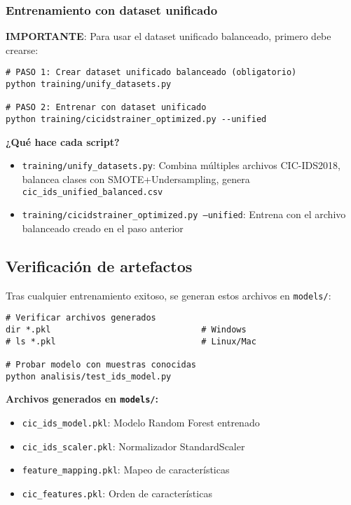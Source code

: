\subsubsection*{Entrenamiento con dataset unificado}
\textbf{IMPORTANTE}: Para usar el dataset unificado balanceado, primero debe crearse:

\begin{lstlisting}[style=tfgbash,caption={Crear y entrenar con dataset unificado},label=List.UnifiedTrain]
# PASO 1: Crear dataset unificado balanceado (obligatorio)
python training/unify_datasets.py

# PASO 2: Entrenar con dataset unificado
python training/cicidstrainer_optimized.py --unified
\end{lstlisting}

\textbf{¿Qué hace cada script?}
\begin{itemize}
  \item \texttt{training/unify\_datasets.py}: Combina múltiples archivos CIC-IDS2018, balancea clases con SMOTE+Undersampling, genera \texttt{cic\_ids\_unified\_balanced.csv}
  \item \texttt{training/cicidstrainer\_optimized.py --unified}: Entrena con el archivo balanceado creado en el paso anterior
\end{itemize}

\subsection*{Verificación de artefactos}
Tras cualquier entrenamiento exitoso, se generan estos archivos en \texttt{models/}:

\begin{lstlisting}[style=tfgbash,caption={Verificar modelo entrenado},label=List.VerifyModel]
# Verificar archivos generados
dir *.pkl                              # Windows
# ls *.pkl                             # Linux/Mac

# Probar modelo con muestras conocidas
python analisis/test_ids_model.py
\end{lstlisting}

\textbf{Archivos generados en \texttt{models/}:}
\begin{itemize}
  \item \texttt{cic\_ids\_model.pkl}: Modelo Random Forest entrenado
  \item \texttt{cic\_ids\_scaler.pkl}: Normalizador StandardScaler
  \item \texttt{feature\_mapping.pkl}: Mapeo de características
  \item \texttt{cic\_features.pkl}: Orden de características
\end{itemize}

